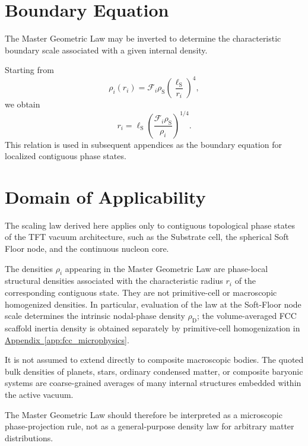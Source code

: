 \section{Boundary Equation}
The Master Geometric Law may be inverted to determine the characteristic boundary scale associated with a given internal density.

Starting from
\begin{equation}
    \rho_i(r_i) = \mathcal{F}_i\rho_{\mathrm{S}} \left( \frac{\ell_{\mathrm{S}}}{r_i} \right)^4,
\end{equation}
we obtain
\begin{equation}
    r_i = \ell_{\mathrm{S}} \left( \frac{\mathcal{F}_i\rho_{\mathrm{S}}}{\rho_i} \right)^{1/4}.
\end{equation}
This relation is used in subsequent appendices as the boundary equation for localized contiguous phase states.

\section{Domain of Applicability}

The scaling law derived here applies only to contiguous topological phase states of the TFT vacuum architecture, such as the Substrate cell, the spherical Soft Floor node, and the continuous nucleon core.

The densities $\rho_i$ appearing in the Master Geometric Law are phase-local structural densities associated with the characteristic radius $r_i$ of the corresponding contiguous state. They are not primitive-cell or macroscopic homogenized densities. In particular, evaluation of the law at the Soft-Floor node scale determines the intrinsic nodal-phase density $\rho_{\mathrm{D}}$; the volume-averaged FCC scaffold inertia density is obtained separately by primitive-cell homogenization in \hyperref[app:fcc_microphysics]{Appendix~\ref*{app:fcc_microphysics}}.

It is not assumed to extend directly to composite macroscopic bodies. The quoted bulk densities of planets, stars, ordinary condensed matter, or composite baryonic systems are coarse-grained averages of many internal structures embedded within the active vacuum.

The Master Geometric Law should therefore be interpreted as a microscopic phase-projection rule, not as a general-purpose density law for arbitrary matter distributions.

